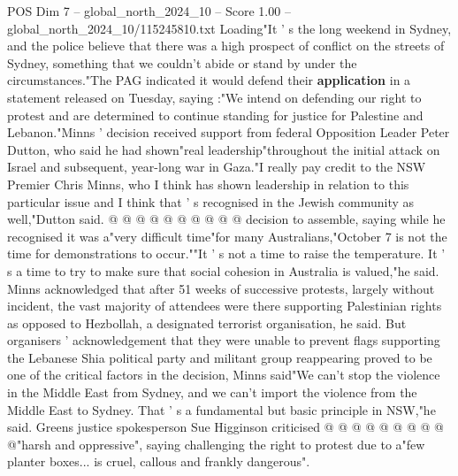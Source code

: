 \begin{textsample}{POS Dim 7 – global\_north\_2024\_10 – Score 1.00 – global\_north\_2024\_10/115245810.txt}
Loading"It ' s the long weekend in Sydney, and the police believe that there was a high prospect of conflict on the streets of Sydney, something that we couldn't abide or stand by under the circumstances."The PAG indicated it would defend their \textbf{application} in a statement released on Tuesday, saying :"We intend on defending our right to protest and are determined to continue standing for justice for Palestine and Lebanon."Minns ' decision received support from federal Opposition Leader Peter Dutton, who said he had shown"real leadership"throughout the initial attack on Israel and subsequent, year-long war in Gaza."I really pay credit to the NSW Premier Chris Minns, who I think has shown leadership in relation to this particular issue and I think that ' s recognised in the Jewish community as well,"Dutton said. @ @ @ @ @ @ @ @ @ @ decision to assemble, saying while he recognised it was a"very difficult time"for many Australians,"October 7 is not the time for demonstrations to occur.""It ' s not a time to raise the temperature.
It ' s a time to try to make sure that social cohesion in Australia is valued,"he said.
Minns acknowledged that after 51 weeks of successive protests, largely without incident, the vast majority of attendees were there supporting Palestinian rights as opposed to Hezbollah, a designated terrorist organisation, he said.
But organisers ' acknowledgement that they were unable to prevent flags supporting the Lebanese Shia political party and militant group reappearing proved to be one of the critical factors in the decision, Minns said"We can't stop the violence in the Middle East from Sydney, and we can't import the violence from the Middle East to Sydney.
That ' s a fundamental but basic principle in NSW,"he said.
Greens justice spokesperson Sue Higginson criticised @ @ @ @ @ @ @ @ @ @"harsh and oppressive", saying challenging the right to protest due to a"few planter boxes... is cruel, callous and frankly dangerous".

\end{textsample}
